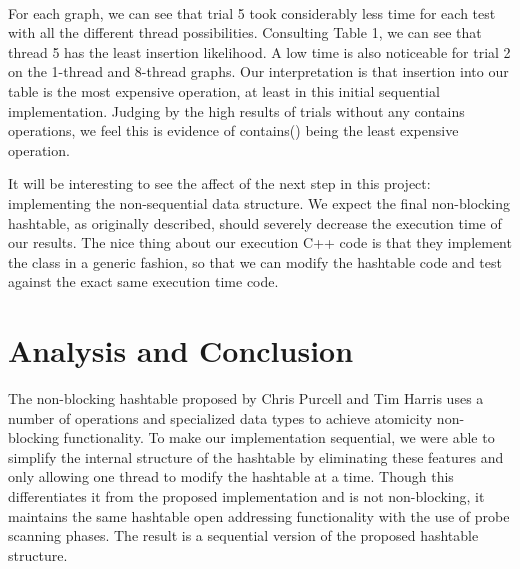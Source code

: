 \documentclass[journal]{IEEEtran}
\begin{document}
\hfill\\

For each graph, we can see that trial 5 took considerably less time for each test with all the different thread possibilities. Consulting Table 1, we can see that thread 5 has the least insertion likelihood. A low time is also noticeable for trial 2 on the 1-thread and 8-thread graphs. Our interpretation is that insertion into our table is the most expensive operation, at least in this initial sequential implementation. Judging by the high results of trials without any contains operations, we feel this is evidence of contains() being the least expensive operation.

It will be interesting to see the affect of the next step in this project: implementing the non-sequential data structure. We expect the final non-blocking hashtable, as originally described, should severely decrease the execution time of our results. The nice thing about our execution C++ code is that they implement the class in a generic fashion, so that we can modify the hashtable code and test against the exact same execution time code.



\section{Analysis and Conclusion}

The non-blocking hashtable proposed by Chris Purcell and Tim Harris uses a number of operations and specialized data types to achieve atomicity non-blocking functionality.  To make our implementation sequential, we were able to simplify the internal structure of the hashtable by eliminating these features and only allowing one thread to modify the hashtable at a time. Though this differentiates it from the proposed implementation and is not non-blocking, it maintains the same hashtable open addressing functionality with the use of probe scanning phases. The result is a sequential version of the proposed hashtable structure.


\ifCLASSOPTIONcaptionsoff
  \newpage
\fi



\end{document}

